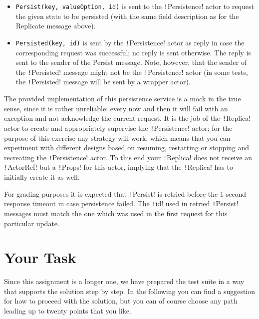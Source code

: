\documentclass{article}
\begin{document}
\begin{itemize}
    \item \texttt{Persist(key, valueOption, id)} is sent to the \texttt!Persistence! actor to request the given state to be persisted (with the same field description as for the Replicate message above).
    \item \texttt{Persisted(key, id)} is sent by the \texttt!Persistence! actor as reply in case the corresponding request was successful; no reply is sent otherwise. The reply is sent to the sender of the Persist message. Note, however, that the sender of the \texttt!Persisted! message might not be the \texttt!Persistence! actor (in some tests, the \texttt!Persisted! message will be sent by a wrapper actor).
\end{itemize}

The provided implementation of this persistence service is a mock in the true sense, since it is rather unreliable: every now and then it will fail with an exception and not acknowledge the current request. It is the job of the \texttt!Replica! actor to create and appropriately supervise the \texttt!Persistence! actor; for the purpose of this exercise any strategy will work, which means that you can experiment with different designs based on resuming, restarting or stopping and recreating the \texttt!Persistence! actor. To this end your \texttt!Replica! does not receive an \texttt!ActorRef! but a \texttt!Props! for this actor, implying that the \texttt!Replica! has to initially create it as well.

For grading purposes it is expected that \texttt!Persist! is retried before the 1 second response timeout in case persistence failed. The \texttt!id! used in retried \texttt!Persist! messages must match the one which was used in the first request for this particular update.

\section{Your Task}\label{s:yourtask}

Since this assignment is a longer one, we have prepared the test suite in a way that supports the solution step by step. In the following you can find a suggestion for how to proceed with the solution, but you can of course choose any path leading up to twenty points that you like.
\end{document}

